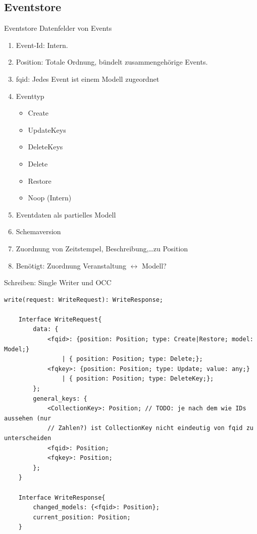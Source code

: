 \documentclass[10pt]{beamer}
\begin{document}
\subsection{Eventstore}
\begin{frame}{Eventstore}
	Datenfelder von Events
	\begin{enumerate}
		\item Event-Id: Intern.
		\item Position: Totale Ordnung, bündelt zusammengehörige Events.
		\item fqid: Jedes Event ist einem Modell zugeordnet
		\item Eventtyp
		\begin{itemize}
			\item Create
			\item UpdateKeys
			\item DeleteKeys
			\item Delete
			\item Restore
			\item Noop (Intern)
		\end{itemize}
		\item Eventdaten als partielles Modell
		\item Schemaversion
		\item Zuordnung von Zeitstempel, Beschreibung,\ldots zu Position
		\item Benötigt: Zuordnung Veranstaltung $\leftrightarrow$ Modell?
	\end{enumerate}
\end{frame}
\begin{frame}[fragile]{Schreiben: Single Writer und OCC}
	\footnotesize
	\begin{Verbatim}[tabsize=2]
	write(request: WriteRequest): WriteResponse;
	
	Interface WriteRequest{
		data: {
			<fqid>: {position: Position; type: Create|Restore; model: Model;}
				| { position: Position; type: Delete;};
			<fqkey>: {position: Position; type: Update; value: any;}
				| { position: Position; type: DeleteKey;};
		};
		general_keys: {
			<CollectionKey>: Position; // TODO: je nach dem wie IDs aussehen (nur
			// Zahlen?) ist CollectionKey nicht eindeutig von fqid zu unterscheiden
			<fqid>: Position;
			<fqkey>: Position;
		};
	}
	
	Interface WriteResponse{
		changed_models: {<fqid>: Position};
		current_position: Position;
	}
	\end{Verbatim}
\end{frame}
\end{document}
